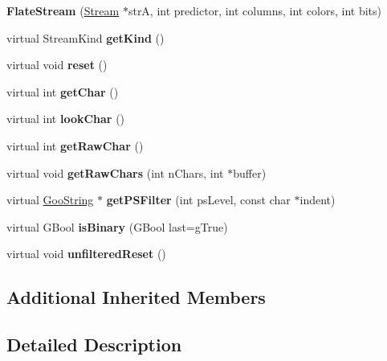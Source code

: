 \begin{DoxyCompactItemize}
{\bfseries Flate\+Stream} (\hyperlink{class_stream}{Stream} $\ast$strA, int predictor, int columns, int colors, int bits)
\item 
\mbox{\label{class_flate_stream_a35e84fbf0673c6d103d7ad0902dea21e}} 
virtual Stream\+Kind {\bfseries get\+Kind} ()
\item 
\mbox{\label{class_flate_stream_a731be1517eb89a9c62d4ddd6d3466679}} 
virtual void {\bfseries reset} ()
\item 
\mbox{\label{class_flate_stream_a4913b51e2664ebd2c0bf458415d6efc8}} 
virtual int {\bfseries get\+Char} ()
\item 
\mbox{\label{class_flate_stream_a95690d8f80262dd36913c2ed170e3860}} 
virtual int {\bfseries look\+Char} ()
\item 
\mbox{\label{class_flate_stream_a982b0d62626b983cf4727833de5480a7}} 
virtual int {\bfseries get\+Raw\+Char} ()
\item 
\mbox{\label{class_flate_stream_a8b1a805bceae0e45bde5309147c9304c}} 
virtual void {\bfseries get\+Raw\+Chars} (int n\+Chars, int $\ast$buffer)
\item 
\mbox{\label{class_flate_stream_acc9557d8194ff1fb9f639722796cf480}} 
virtual \hyperlink{class_goo_string}{Goo\+String} $\ast$ {\bfseries get\+P\+S\+Filter} (int ps\+Level, const char $\ast$indent)
\item 
\mbox{\label{class_flate_stream_ac65b6af704eeb924ad879cc79a02e39a}} 
virtual G\+Bool {\bfseries is\+Binary} (G\+Bool last=g\+True)
\item 
\mbox{\label{class_flate_stream_a54849017ba05dc5b8d209754455330e4}} 
virtual void {\bfseries unfiltered\+Reset} ()
\end{DoxyCompactItemize}
\subsection*{Additional Inherited Members}


\subsection{Detailed Description}


